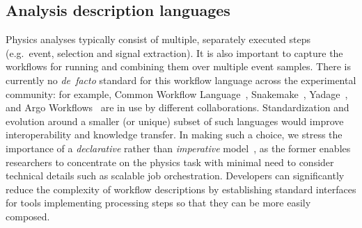 \documentclass[11pt]{article}
\begin{document}





\subsection{Analysis description languages}

Physics analyses typically consist of multiple, separately executed steps (e.g.~event, selection and signal extraction). It is also important to capture the workflows for running and combining them over multiple event samples. There is currently no \emph{de~facto} standard for this workflow language across the experimental community: for example, Common Workflow Language~\cite{CWL}, Snakemake~\cite{SnakeMake}, Yadage~\cite{Cranmer:2017frf,yadage_code}, and Argo Workflows~\cite{argo} are in use by different collaborations. Standardization and evolution around a smaller (or unique) subset of such languages would improve interoperability and knowledge transfer. In making such a choice, we stress the importance of a \textsl{declarative} rather than \textsl{imperative} model~\cite{10.3389/fdata.2021.661501}, as the former enables researchers to concentrate on the physics task with minimal need to consider technical details such as scalable job orchestration. Developers can significantly reduce the complexity of workflow descriptions by establishing standard interfaces for tools implementing processing steps so that they can be more easily composed.
\end{document}
